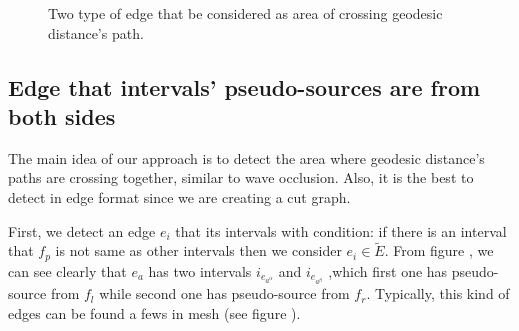 \documentclass[a4paper,twoside]{article}
\begin{document}
\begin{figure}[h!]
	\centering		
	\hspace{10pt}
	\hspace{0.00\columnwidth}
	\caption[]{Two type of edge that be considered as area of crossing geodesic distance's path.}
	\label{fig:fig-two-type-edges}
\end{figure}


\subsection{Edge that intervals' pseudo-sources are from both sides}
\label{subsec:pseudo-sources laid on both side of adjacent faces}
The main idea of our approach is to detect the area where geodesic distance's paths are crossing together, similar to wave occlusion. Also, it is the best to detect in edge format since we are creating a cut graph.

First, we detect an edge $e_i$ that its intervals with condition: if there is an interval that $f_p$ is not same as other intervals then we consider $e_i \in \tilde{E}$. From figure , we can see clearly that $e_a$ has two intervals $i_{e_{a^\alpha}}$ and $i_{e_{a^\beta}}$ ,which first one has pseudo-source from $f_l$ while second one has pseudo-source from $f_r$. Typically, this kind of edges can be found a fews in mesh (see figure ). 
\end{document}
